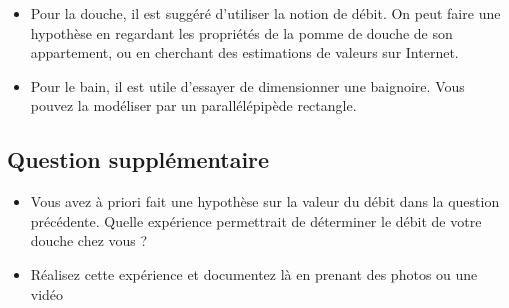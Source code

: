 \documentclass[a4paper,12pt]{article}
\begin{document}
\begin{itemize}[noitemsep]
  \item Pour la douche, il est suggéré d'utiliser la notion de débit. On peut faire une hypothèse en regardant les propriétés de la pomme de douche de son appartement, ou en cherchant des estimations de valeurs sur Internet.
  \item Pour le bain, il est utile d'essayer de dimensionner une baignoire. Vous pouvez la modéliser par un parallélépipède rectangle.
\end{itemize}
\vspace{1em}


\subsection*{Question supplémentaire}

\begin{itemize}[noitemsep]
  \item Vous avez à priori fait une hypothèse sur la valeur du débit dans la question précédente. Quelle expérience permettrait de déterminer le débit de votre douche chez vous ?
  \item Réalisez cette expérience et documentez là en prenant des photos ou une vidéo 
\end{itemize}
\end{document}
